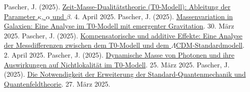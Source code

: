 \documentclass[a4paper,12pt]{article}
\begin{document}
	\begin{thebibliography}{99}
		 Pascher, J. (2025). \href{https://github.com/jpascher/T0-Time-Mass-Duality/tree/main/2/pdf/Deutsch/ZeitMasseT0Params.pdf}{Zeit-Masse-Dualitätstheorie (T0-Modell): Ableitung der Parameter \(\kappa\), \(\alpha\) und \(\beta\)}. 4. April 2025.
		 Pascher, J. (2025). \href{https://github.com/jpascher/T0-Time-Mass-Duality/tree/main/2/pdf/Deutsch/MassVarGalaxien.pdf}{Massenvariation in Galaxien: Eine Analyse im T0-Modell mit emergenter Gravitation}. 30. März 2025.
		 Pascher, J. (2025). \href{https://github.com/jpascher/T0-Time-Mass-Duality/tree/main/2/pdf/Deutsch/MessdifferenzenT0Standard.pdf}{Kompensatorische und additive Effekte: Eine Analyse der Messdifferenzen zwischen dem T0-Modell und dem \(\Lambda\)CDM-Standardmodell}. 2. April 2025.
		 Pascher, J. (2025). \href{https://github.com/jpascher/T0-Time-Mass-Duality/tree/main/2/pdf/Deutsch/DynMassePhotonenNichtlokal.pdf}{Dynamische Masse von Photonen und ihre Auswirkungen auf Nichtlokalität im T0-Modell}. 25. März 2025.
		 Pascher, J. (2025). \href{https://github.com/jpascher/T0-Time-Mass-Duality/tree/main/2/pdf/Deutsch/NotwendigkeitQMErweiterung.pdf}{Die Notwendigkeit der Erweiterung der Standard-Quantenmechanik und Quantenfeldtheorie}. 27. März 2025.
	\end{thebibliography}
	
\end{document}
